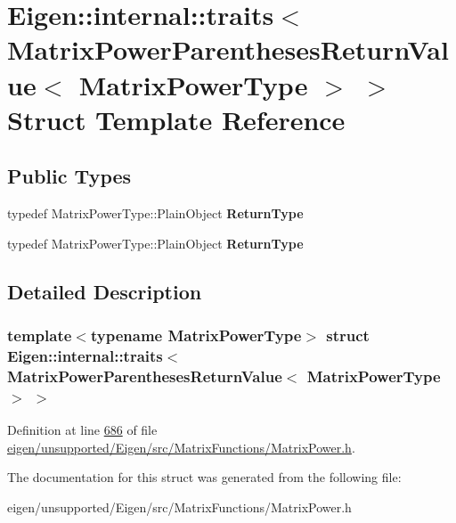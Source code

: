 \hypertarget{struct_eigen_1_1internal_1_1traits_3_01_matrix_power_parentheses_return_value_3_01_matrix_power_type_01_4_01_4}{}\section{Eigen\+:\+:internal\+:\+:traits$<$ Matrix\+Power\+Parentheses\+Return\+Value$<$ Matrix\+Power\+Type $>$ $>$ Struct Template Reference}
\label{struct_eigen_1_1internal_1_1traits_3_01_matrix_power_parentheses_return_value_3_01_matrix_power_type_01_4_01_4}
\subsection*{Public Types}
\begin{DoxyCompactItemize}
\item 
\mbox{\label{struct_eigen_1_1internal_1_1traits_3_01_matrix_power_parentheses_return_value_3_01_matrix_power_type_01_4_01_4_ad6084e1932900a9c2b8193f1e5373692}} 
typedef Matrix\+Power\+Type\+::\+Plain\+Object {\bfseries Return\+Type}
\item 
\mbox{\label{struct_eigen_1_1internal_1_1traits_3_01_matrix_power_parentheses_return_value_3_01_matrix_power_type_01_4_01_4_ad6084e1932900a9c2b8193f1e5373692}} 
typedef Matrix\+Power\+Type\+::\+Plain\+Object {\bfseries Return\+Type}
\end{DoxyCompactItemize}


\subsection{Detailed Description}
\subsubsection*{template$<$typename Matrix\+Power\+Type$>$\newline
struct Eigen\+::internal\+::traits$<$ Matrix\+Power\+Parentheses\+Return\+Value$<$ Matrix\+Power\+Type $>$ $>$}



Definition at line \hyperlink{eigen_2unsupported_2_eigen_2src_2_matrix_functions_2_matrix_power_8h_source_l00686}{686} of file \hyperlink{eigen_2unsupported_2_eigen_2src_2_matrix_functions_2_matrix_power_8h_source}{eigen/unsupported/\+Eigen/src/\+Matrix\+Functions/\+Matrix\+Power.\+h}.



The documentation for this struct was generated from the following file\+:\begin{DoxyCompactItemize}
\item 
eigen/unsupported/\+Eigen/src/\+Matrix\+Functions/\+Matrix\+Power.\+h\end{DoxyCompactItemize}
